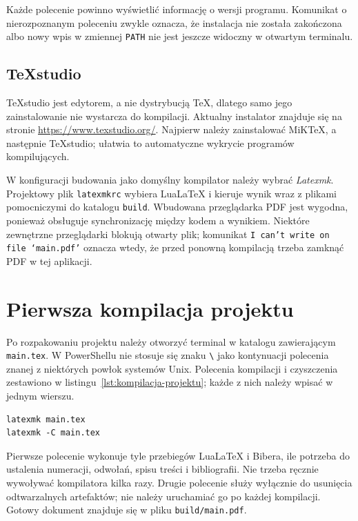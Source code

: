 Każde polecenie powinno wyświetlić informację o wersji programu. Komunikat o nierozpoznanym poleceniu zwykle oznacza, że instalacja nie została zakończona albo nowy wpis w zmiennej \texttt{PATH} nie jest jeszcze widoczny w otwartym terminalu.

\subsection{TeXstudio}

TeXstudio jest edytorem, a nie dystrybucją TeX, dlatego samo jego zainstalowanie nie wystarcza do kompilacji. Aktualny instalator znajduje się na stronie \url{https://www.texstudio.org/}. Najpierw należy zainstalować MiKTeX, a następnie TeXstudio; ułatwia to automatyczne wykrycie programów kompilujących.

W konfiguracji budowania jako domyślny kompilator należy wybrać \emph{Latexmk}. Projektowy plik \texttt{latexmkrc} wybiera LuaLaTeX i kieruje wynik wraz z plikami pomocniczymi do katalogu \texttt{build}. Wbudowana przeglądarka PDF jest wygodna, ponieważ obsługuje synchronizację między kodem a wynikiem. Niektóre zewnętrzne przeglądarki blokują otwarty plik; komunikat \texttt{I can't write on file `main.pdf'} oznacza wtedy, że przed ponowną kompilacją trzeba zamknąć PDF w tej aplikacji.

\section{Pierwsza kompilacja projektu}

Po rozpakowaniu projektu należy otworzyć terminal w katalogu zawierającym \texttt{main.tex}. W PowerShellu nie stosuje się znaku \texttt{\textbackslash} jako kontynuacji polecenia znanej z niektórych powłok systemów Unix. Polecenia kompilacji i czyszczenia zestawiono w listingu~\ref{lst:kompilacja-projektu}; każde z nich należy wpisać w jednym wierszu.

\begin{lstlisting}[style=thesis-shell,caption={Kompilacja i czyszczenie projektu},label={lst:kompilacja-projektu}]
latexmk main.tex
latexmk -C main.tex
\end{lstlisting}

Pierwsze polecenie wykonuje tyle przebiegów LuaLaTeX i Bibera, ile potrzeba do ustalenia numeracji, odwołań, spisu treści i bibliografii. Nie trzeba ręcznie wywoływać kompilatora kilka razy. Drugie polecenie służy wyłącznie do usunięcia odtwarzalnych artefaktów; nie należy uruchamiać go po każdej kompilacji. Gotowy dokument znajduje się w pliku \texttt{build/main.pdf}.


